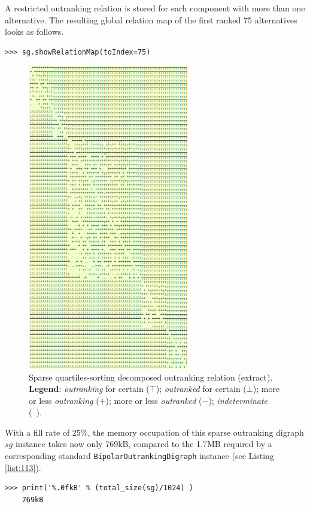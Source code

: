 A restricted outranking relation is stored for each component with more than one alternative. The resulting global relation map of the first ranked 75 alternatives looks as follows.

\begin{lstlisting}
>>> sg.showRelationMap(toIndex=75)
\end{lstlisting}  

\begin{figure}[h]
\sidecaption
\includegraphics[width=7cm]{Figures/sparseRelationMap.png}
\caption{Sparse quartiles-sorting decomposed outranking relation (extract). \textbf{Legend}: \emph{outranking} for certain ($\top$); \emph{outranked} for certain ($\bot$); more or less \emph{outranking} ($+$); more or less \emph{outranked} ($-$); \emph{indeterminate} (\ ).
}
\label{fig:11.1}       %
\end{figure}
\clearpage

With a fill rate of $25\%$, the memory occupation of this sparse outranking digraph $sg$ instance takes now only 769kB, compared to the 1.7MB required by a corresponding standard \texttt{BipolarOutrankingDigraph} instance (see Listing \ref{list:113}).

\begin{lstlisting}
>>> print('%.0fkB' % (total_size(sg)/1024) )
    769kB
\end{lstlisting}

